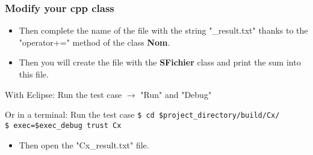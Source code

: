 \documentclass[10pt, hyperref={unicode=true,pdfusetitle, bookmarks=true,bookmarksnumbered=false,bookmarksopen=false, breaklinks=false,pdfborder={0 0 1},backref=true,colorlinks=true,linkcolor=darkblue,pageanchor, urlcolor=darkblue}]{beamer}
\begin{document}
\begin{frame}
\frametitle{Modify your cpp class}

\begin{block}{}
\begin{itemize}
\item Then complete the name of the file with the string "\_result.txt" thanks to the "operator+=" method of the class \textbf{Nom}.
\item Then you will create the file with the \textbf{SFichier} class and print the sum into this file.
\end{itemize}
\end{block}

\begin{exampleblock}{With Eclipse: Run the test case}
$\rightarrow$ "Run" and "Debug"\\
\end{exampleblock}

\begin{block}{Or in a terminal: Run the test case}
\texttt{\$ cd \$project\_directory/build/Cx/}\\
\texttt{\$ exec=\$exec\_debug trust Cx}
\end{block}

\begin{block}{}
\begin{itemize}
\item Then open the "Cx\_result.txt" file.
\end{itemize}
\end{block}

\end{frame}
\end{document}
